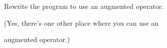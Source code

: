  Rewrite the program to use an augmented operator.

(Yes, there's one other place where you can use an

augmented operator.)

